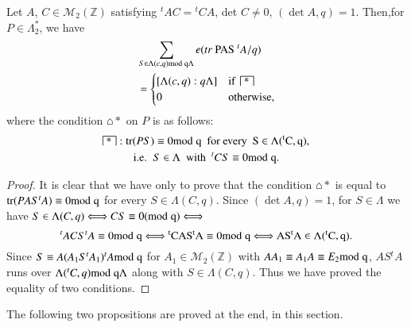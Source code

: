 \begin{sublemma}\label{c1:lem-1.5.5}
Let $A$, $C\in\mathscr{M}_{2}(\mathbb{Z})$ satisfying
${}^{t}AC={}^{t}CA$, det $C\neq 0$, $(\det
A,q)=1$. Then,\pageoriginale for $P\in\Lambda^{\ast}_{2}$, we have
\begin{align*}
& \sum_{S\in\Lambda(c,q)\rm{mod} \; q\Lambda}e(tr\text{ PAS }{}^{t}A/q)\\
&=
\begin{cases}
[\Lambda(c,q):q\Lambda] & \text{if \ } \house{\ast}\\
0 & \text{otherwise,}
\end{cases}
\end{align*}
where the condition $\house{\ast}$ on $P$ is as follows:
\begin{gather*}
\house{\ast}:\tr(PS)\equiv 0\rm{mod} \; q\text{ \ for every \ }
S\in\Lambda({}^{t}C,q),\\
\text{\ie \ } S\in\Lambda \text{ \ with \ } {}^{t}CS\equiv 0\rm{mod} \; q.
\end{gather*}
\end{sublemma}

\begin{proof}
It is clear that we have only to prove that the condition
$\house{\ast}$ is equal to $\operatorname{tr}(PAS^{t}A)\equiv 0\rm{mod} \; q$ for
every $S\in\Lambda(C,q)$. Since $(\det A,q)=1$, for $S\in\Lambda$ we
have $S\in\Lambda(C,q)\Longleftrightarrow CS\equiv 0(\rm{mod} \;
q)\Longleftrightarrow$ 
$$
{}^{t}ACS{}^{t}A\equiv 0\rm{mod} \; q\Longleftrightarrow
{}^{t}CAS{}^{t}A\equiv 0\rm{mod} \; q\Longleftrightarrow AS{}^{t}A\in
\Lambda({}^{t}C,q). 
$$
Since $S\equiv A(A_{1}S{}^{t}A_{1}){}^{t}A\rm{mod} \; q$ for
$A_{1}\in\mathscr{M}_{2}(\mathbb{Z})$ with $AA_{1}\equiv A_{1}A\equiv
E_{2}\rm{mod} \; q$, $AS{}^{t}A$ runs over $\Lambda({}^{t}C,q)\rm{mod} \; q\Lambda$
along with $S\in\Lambda(C,q)$. Thus we have proved the equality of two
conditions. 
\end{proof}

The following two propositions are proved at the end, in this section.

